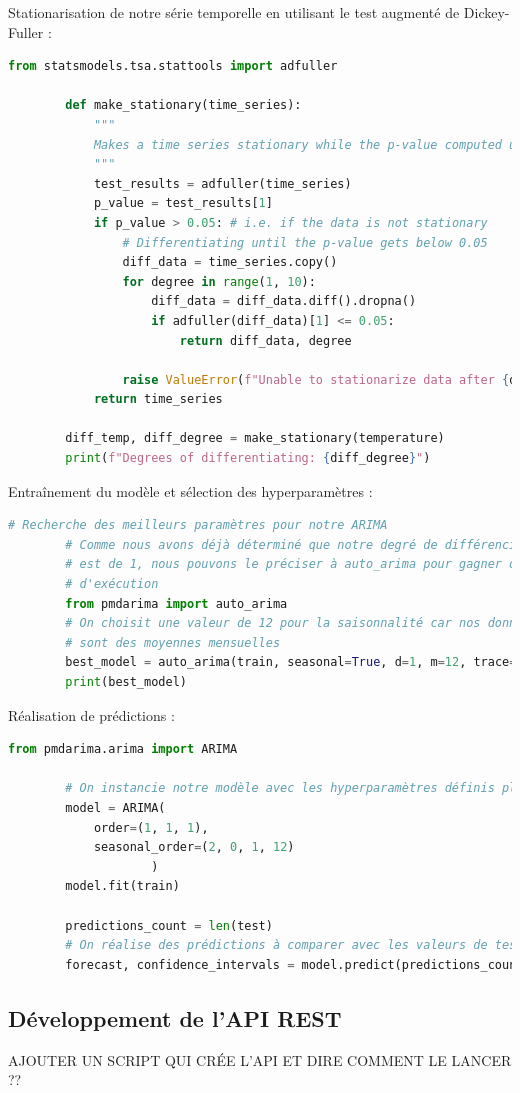 \documentclass[french]{article}
\begin{document}
    Stationarisation de notre série temporelle en utilisant le test augmenté de Dickey-Fuller :
    \begin{lstlisting}[language=Python]
        from statsmodels.tsa.stattools import adfuller
    
        def make_stationary(time_series):
            """
            Makes a time series stationary while the p-value computed using the ADF test is higher than 0.05
            """
            test_results = adfuller(time_series)
            p_value = test_results[1]
            if p_value > 0.05: # i.e. if the data is not stationary
                # Differentiating until the p-value gets below 0.05
                diff_data = time_series.copy()
                for degree in range(1, 10):
                    diff_data = diff_data.diff().dropna()
                    if adfuller(diff_data)[1] <= 0.05:
                        return diff_data, degree
                
                raise ValueError(f"Unable to stationarize data after {degree} times")
            return time_series
        
        diff_temp, diff_degree = make_stationary(temperature)
        print(f"Degrees of differentiating: {diff_degree}")
    \end{lstlisting}

    Entraînement du modèle et sélection des hyperparamètres :
    \begin{lstlisting}[language=Python]
        # Recherche des meilleurs paramètres pour notre ARIMA
        # Comme nous avons déjà déterminé que notre degré de différenciation
        # est de 1, nous pouvons le préciser à auto_arima pour gagner du temps
        # d'exécution
        from pmdarima import auto_arima
        # On choisit une valeur de 12 pour la saisonnalité car nos données
        # sont des moyennes mensuelles
        best_model = auto_arima(train, seasonal=True, d=1, m=12, trace=True)
        print(best_model)
        \end{lstlisting}
    
    Réalisation de prédictions :
    \begin{lstlisting}[language=Python]
        from pmdarima.arima import ARIMA
    
        # On instancie notre modèle avec les hyperparamètres définis plus tôt
        model = ARIMA(
            order=(1, 1, 1),
            seasonal_order=(2, 0, 1, 12)
                    )
        model.fit(train)
    
        predictions_count = len(test)
        # On réalise des prédictions à comparer avec les valeurs de test
        forecast, confidence_intervals = model.predict(predictions_count, return_conf_int=True) 
        \end{lstlisting}
    \subsection*{Développement de l'API REST}
    AJOUTER UN SCRIPT QUI CRÉE L'API ET DIRE COMMENT LE LANCER ??

    
\end{document}
